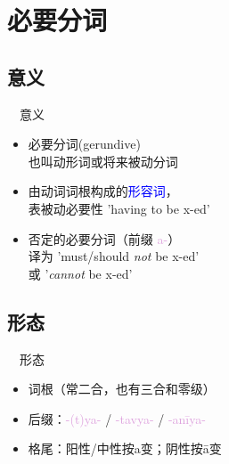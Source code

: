 \documentclass[17pt]{beamer}
\newcommand{\pratyaya}[1]{\mbox{\textcolor{Plum}{#1}}}
\newcommand{\important}[1]{\textcolor{blue}{#1}}
\begin{document}
\section{必要分词}
\begin{frame}{\insertsection}
  \small
  \tableofcontents[currentsection]
\end{frame}

\subsection{意义}
\begin{frame}{\insertsection ~~意义}
  \small
  \begin{itemize}
    \item 必要分词(gerundive)\\
    也叫动形词或将来被动分词
    \item 由动词词根构成的\important{形容词}，\\
    表被动必要性 'having to be x-ed'
    \item 否定的必要分词（前缀 \pratyaya{a-}）\\译为 'must/should \emph{not} be \mbox{x-ed}' \\或 '\emph{cannot} be x-ed'
  \end{itemize}
\end{frame}

\subsection{形态}
\begin{frame}{\insertsection ~~形态}
  \small
  \begin{itemize}
    \item 词根（常二合，也有三合和零级）
    \item 后缀：\pratyaya{-(t)ya-} / \pratyaya{-tavya-} / \pratyaya{-anīya-}
    \item 格尾：阳性/中性按a变；阴性按ā变
  \end{itemize}
\end{frame}
\end{document}
